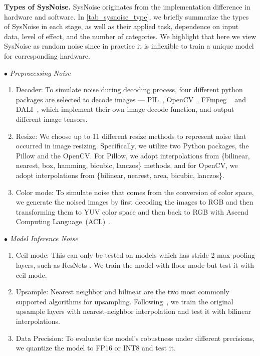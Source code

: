 \textbf{Types of SysNoise.} SysNoise originates from the implementation difference in hardware and software. In \autoref{tab_sysnoise_type}, we briefly summarize the types of SysNoise in each stage, as well as their applied task, dependence on input data, level of effect, and the number of categories. We highlight that here we view SysNoise as random noise since in practice it is inflexible to train a unique model for corresponding hardware. 


$\bullet$ \emph{Preprocessing Noise}
    \begin{enumerate}[nosep, leftmargin=1.9em]
        \item Decoder: To simulate noise during decoding process, four different python packages are selected to decode images — PIL~\cite{umesh2012image}, OpenCV~\cite{opencv_library}, FFmpeg ~\cite{ffmpeg_library} and DALI~\cite{nvidia-dali}, which implement their own image decode function, and output different image tensors. 
        \item Resize: We choose up to 11 different resize methods to represent noise that occurred in image resizing. Specifically, we utilize two Python packages, the Pillow and the OpenCV. For Pillow, we adopt interpolations from \{bilinear, nearest, box, hamming, bicubic, lanczos\} methods, and for OpenCV, we adopt interpolations from \{bilinear, nearest, area, bicubic, lanczos\}. 
        \item Color mode: To simulate noise that comes from the conversion of color space, we generate the noised images by first decoding the images to RGB and then transforming them to YUV color space and then back to RGB with Ascend Computing Language~(ACL)~\cite{cann}.
    \end{enumerate}
    
$\bullet$ \emph{Model Inference Noise}
    \begin{enumerate}[nosep, leftmargin=1.9em]
        \item Ceil mode: This can only be tested on models which has stride 2 max-pooling layers, such as ResNets \cite{he2016deep}. We train the model with floor mode but test it with ceil mode.
        \item Upsample: Nearest neighbor and bilinear are the two most commonly supported algorithms for upsampling. Following~\cite{faster-fpn}, we train the original upsample layers with nearest-neighbor interpolation and test it with bilinear interpolations.
        \item Data Precision: To evaluate the model's robustness under different precisions, we quantize the model to FP16 or INT8 and test it. 
    \end{enumerate}
    
